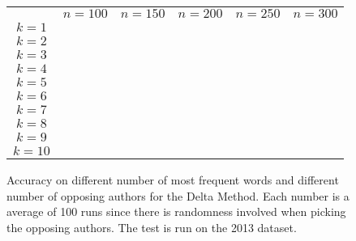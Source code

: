 \begin{figure}
    \begin{tabular}{cccccc}
               & $n=100$ & $n=150$ & $n=200$ & $n=250$ & $n=300$ \\
        $k=1$  &         &         &         &         &         \\
        $k=2$  &         &         &         &         &         \\
        $k=3$  &         &         &         &         &         \\
        $k=4$  &         &         &         &         &         \\
        $k=5$  &         &         &         &         &         \\
        $k=6$  &         &         &         &         &         \\
        $k=7$  &         &         &         &         &         \\
        $k=8$  &         &         &         &         &         \\
        $k=9$  &         &         &         &         &         \\
        $k=10$ &         &         &         &         &
    \end{tabular}
    \caption{Accuracy on different number of most frequent words and different
        number of opposing authors for the Delta Method. Each number is a
        average of 100 runs since there is randomness involved when picking the
        opposing authors. The test is run on the 2013 dataset.}
\end{figure}

